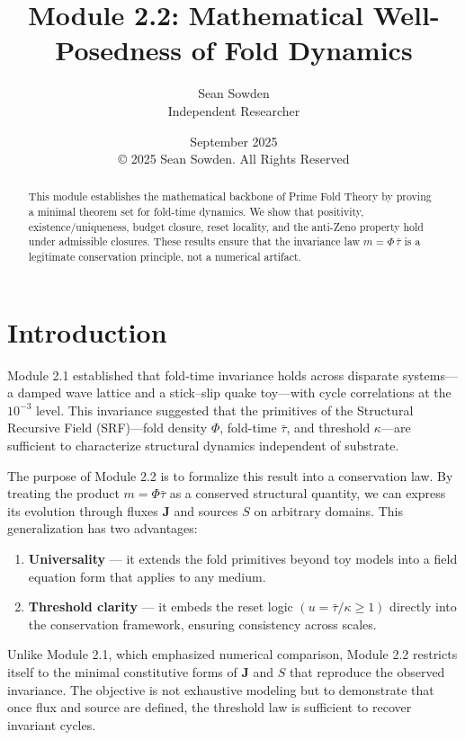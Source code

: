 \documentclass[11pt]{article}
\title{Module 2.2: Mathematical Well-Posedness of Fold Dynamics}
\author{Sean Sowden \\ Independent Researcher}
\date{September 2025 \\[1ex]
© 2025 Sean Sowden. All Rights Reserved}
\begin{document}
\maketitle
\begin{abstract}
This module establishes the mathematical backbone of Prime Fold Theory by 
proving a minimal theorem set for fold-time dynamics. We show that positivity,
existence/uniqueness, budget closure, reset locality, and the anti-Zeno property 
hold under admissible closures. %
These results ensure that the invariance law $m = \Phi\, \bar{\tau}$ is a legitimate conservation principle, not a numerical artifact.

\end{abstract}

\tableofcontents
\newpage

\section{Introduction}
Module 2.1 established that fold-time invariance holds across disparate systems---a damped wave lattice and a stick--slip quake toy---with cycle correlations at the $10^{-3}$ level. This invariance suggested that the primitives of the Structural Recursive Field (SRF)---fold density $\Phi$, fold-time $\bar{\tau}$, and threshold $\kappa$---are sufficient to characterize structural dynamics independent of substrate.

The purpose of Module 2.2 is to formalize this result into a conservation law. By treating the product $m = \Phi \bar{\tau}$ as a conserved structural quantity, we can express its evolution through fluxes $\mathbf{J}$ and sources $S$ on arbitrary domains. This generalization has two advantages:

\begin{enumerate}
    \item \textbf{Universality} --- it extends the fold primitives beyond toy models into a field equation form that applies to any medium.
    \item \textbf{Threshold clarity} --- it embeds the reset logic $(u = \bar{\tau}/\kappa \geq 1)$ directly into the conservation framework, ensuring consistency across scales.
\end{enumerate}

Unlike Module 2.1, which emphasized numerical comparison, Module 2.2 restricts itself to the minimal constitutive forms of $\mathbf{J}$ and $S$ that reproduce the observed invariance. The objective is not exhaustive modeling but to demonstrate that once flux and source are defined, the threshold law is sufficient to recover invariant cycles.
\end{document}
